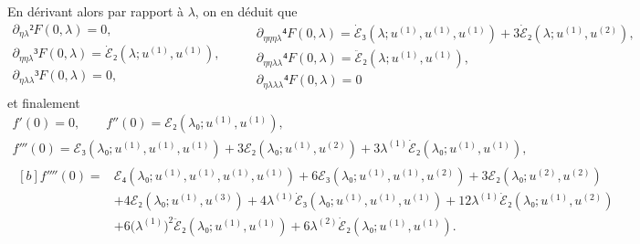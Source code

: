 \documentclass[12pt, final]{scrartcl}
\theoremstyle{definition}
\newcommand{\order}[2][1]{#2^{(#1)}}
\begin{document}
En dérivant alors par rapport à \(λ\), on en déduit que\\
\begin{equation*}
  \begin{gathered}
    ∂_{ηλ}² F(0, λ) = 0,\\
    ∂_{ηηλ}³ F(0, λ) = \dot{ℰ}₂(λ; \order[1]u, \order[1]u),\\
    ∂_{ηλλ}³ F(0, λ) = 0,\\
  \end{gathered}
  \qquad
  \begin{gathered}
    ∂_{ηηηλ}⁴ F(0, λ) = \dot{ℰ}₃(λ; \order[1]u, \order[1]u, \order[1]u) + 3\dot{ℰ}₂(λ; \order[1]u, \order[2]u),\\
    ∂_{ηηλλ}⁴ F(0, λ) = \ddot{ℰ}₂(λ; \order[1]u, \order[1]u),\\
    ∂_{ηλλλ}⁴ F(0, λ) = 0
  \end{gathered}
\end{equation*}
et finalement
\begin{gather*}
    f'(0) = 0, \qquad f''(0) = ℰ₂(λ₀; \order[1]u, \order[1]u),\\
    f'''(0) =ℰ₃(λ₀; \order[1]u, \order[1]u, \order[1]u) + 3ℰ₂(λ₀; \order[1]u, \order[2]u) + 3\order[1]λ \dot{ℰ}₂(λ₀; \order[1]u, \order[1]u),\\
    \begin{aligned}[b]
      f''''(0) ={}
      & ℰ₄(λ₀; \order[1]u, \order[1]u, \order[1]u, \order[1]u) + 6ℰ₃(λ₀; \order[1]u, \order[1]u, \order[2]u) + 3ℰ₂(λ₀; \order[2]u, \order[2]u)\\
      & + 4ℰ₂(λ₀; \order[1]u, \order[3]u) + 4 \order[1]λ \dot{ℰ}₃(λ₀; \order[1]u, \order[1]u, \order[1]u) + 12 \order[1]λ \dot{ℰ}₂(λ₀; \order[1]u, \order[2]u)\\
      & + 6\bigl( \order[1]λ \bigr)^2 \ddot{ℰ}₂(λ₀; \order[1]u, \order[1]u) + 6\order[2]λ \dot{ℰ}₂(λ₀; \order[1]u, \order[1]u).
    \end{aligned}
\end{gather*}
\end{document}
